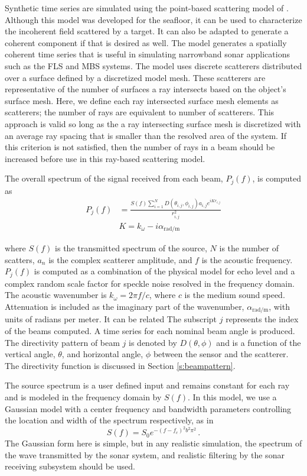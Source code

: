 \documentclass[utf8]{frontiersSCNS} %
\begin{document}
Synthetic time series are simulated using the point-based scattering model of \cite{brown17point}. Although this model was developed for the seafloor, it can be used to characterize the incoherent field scattered by a target. It can also be adapted to generate a coherent component if that is desired as well. The model generates a spatially coherent time series that is useful in simulating narrowband sonar applications such as the FLS and MBS systems. The model uses discrete scatterers distributed over a surface defined by a discretized model mesh. These scatterers are representative of the number of surfaces a ray intersects based on the object's surface mesh. Here, we define each ray intersected surface mesh elements as scatterers; the number of rays are equivalent to number of scatterers. This approach is valid so long as the a ray intersecting surface mesh is discretized with an average ray spacing that is smaller than the resolved area of the system. If this criterion is not satisfied, then the number of rays in a beam should be increased before use in this ray-based scattering model.

The overall spectrum of the signal received from each beam, $P_j(f)$, is computed as
\begin{align}
    P_j(f) &= \frac{S(f)\sum^N_{i=1}D(\theta_{i,j},\phi_{i,j})a_{i,j}e^{iKr_{i,j}}}{r_{i,j}^2} 
    \label{e:scatteringmodel} \\
    & K = k_\omega - i\alpha_{\textrm{rad/m}} \nonumber
\end{align}

where $S(f)$ is the transmitted spectrum of the source, $N$ is the number of scatters, $a_n$ is the complex scatterer amplitude, and $f$ is the acoustic frequency. $P_j(f)$ is computed as a combination of the physical model for echo level and a complex random scale factor for speckle noise resolved in the frequency domain. The acoustic wavenumber is $k_\omega = 2\pi f/c$, where $c$ is the medium sound speed. Attenuation is included as the imaginary part of the wavenumber, $\alpha_{\textrm{rad/m}}$, with units of radians per meter. It can be related The subscript $j$ represents the index of the beams computed. A time series for each nominal beam angle is produced. The directivity pattern of beam $j$ is denoted by $D(\theta,\phi)$ and is a function of the vertical angle, $\theta$, and horizontal angle, $\phi$ between the sensor and the scatterer. The directivity function is discussed in Section \ref{s:beampattern}.

The source spectrum is a user defined input and remains constant for each ray and is modeled in the frequency domain by $S(f)$. In this model, we use a Gaussian model with a center frequency and bandwidth parameters controlling the location and width of the spectrum respectively, as in
\begin{equation}
    S(f) = S_0e^{-(f-f_c)^2b^2\pi^2} \, .
\end{equation}
The Gaussian form here is simple, but in any realistic simulation, the spectrum of the wave transmitted by the sonar system, and realistic filtering by the sonar receiving subsystem should be used.
\end{document}
